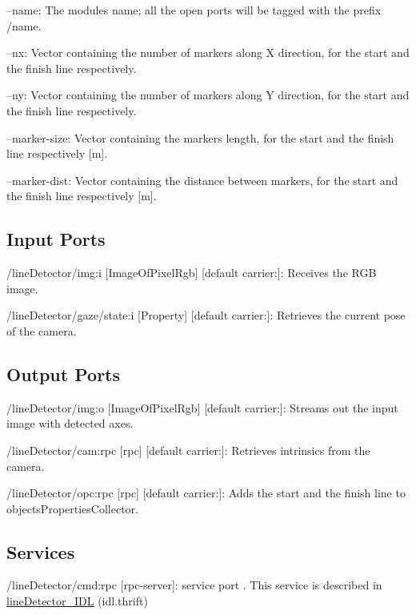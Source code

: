 \begin{DoxyItemize}
\item --name\+: The module\textquotesingle{}s name; all the open ports will be tagged with the prefix /name.
\item --nx\+: Vector containing the number of markers along X direction, for the start and the finish line respectively.
\item --ny\+: Vector containing the number of markers along Y direction, for the start and the finish line respectively.
\item --marker-\/size\+: Vector containing the marker\textquotesingle{}s length, for the start and the finish line respectively \mbox{[}m\mbox{]}.
\item --marker-\/dist\+: Vector containing the distance between markers, for the start and the finish line respectively \mbox{[}m\mbox{]}. 
\end{DoxyItemize}\hypertarget{group__skeletonViewer_inputports_sec}{}\subsection{Input Ports}\label{group__skeletonViewer_inputports_sec}

\begin{DoxyItemize}
\item /line\+Detector/img\+:i \mbox{[}Image\+Of\+Pixel\+Rgb\mbox{]} \mbox{[}default carrier\+:\mbox{]}\+: Receives the R\+GB image.
\item /line\+Detector/gaze/state\+:i \mbox{[}Property\mbox{]} \mbox{[}default carrier\+:\mbox{]}\+: Retrieves the current pose of the camera.
\end{DoxyItemize}\hypertarget{group__skeletonViewer_outputports_sec}{}\subsection{Output Ports}\label{group__skeletonViewer_outputports_sec}

\begin{DoxyItemize}
\item /line\+Detector/img\+:o \mbox{[}Image\+Of\+Pixel\+Rgb\mbox{]} \mbox{[}default carrier\+:\mbox{]}\+: Streams out the input image with detected axes.
\item /line\+Detector/cam\+:rpc \mbox{[}rpc\mbox{]} \mbox{[}default carrier\+:\mbox{]}\+: Retrieves intrinsics from the camera.
\item /line\+Detector/opc\+:rpc \mbox{[}rpc\mbox{]} \mbox{[}default carrier\+:\mbox{]}\+: Adds the start and the finish line to objects\+Properties\+Collector.
\end{DoxyItemize}\hypertarget{group__skeletonViewer_services_sec}{}\subsection{Services}\label{group__skeletonViewer_services_sec}

\begin{DoxyItemize}
\item /line\+Detector/cmd\+:rpc \mbox{[}rpc-\/server\mbox{]}\+: service port . This service is described in \hyperlink{classlineDetector__IDL}{line\+Detector\+\_\+\+I\+DL} (idl.\+thrift) 
\end{DoxyItemize}
